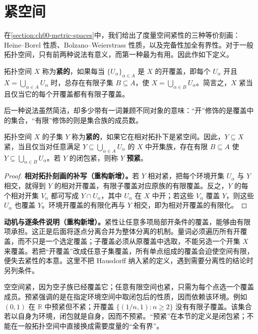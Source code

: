 \documentclass[../../main.tex]{subfiles}%
\begin{document}
\section{紧空间}\label{section:ch04-compact-spaces}
在\cref{section:ch00-metric-spaces}中，我们给出了度量空间紧性的三种等价刻画：Heine--Borel 性质、Bolzano--Weierstrass 性质，以及完备性加全有界性。对于一般拓扑空间，只有前两种说法有意义，而第一种最为有用。因此作如下定义。
\begin{definition}[紧空间]\label{definition:ch04-compact}
拓扑空间 $X$ 称为\textbf{紧的}，如果每当 $\{U_\alpha\}_{\alpha\in A}$ 是 $X$ 的开覆盖，即每个 $U_\alpha$ 开且 $X=\bigcup_{\alpha\in A}U_\alpha$ 时，总存在有限子集 $B\subseteq A$，使 $X=\bigcup_{\alpha\in B}U_\alpha$。简言之，$X$ 紧当且仅当它的每个开覆盖都有有限子覆盖。
\end{definition}
后一种说法虽然简洁，却多少带有一词兼顾不同对象的意味：“开”修饰的是覆盖中的集合，“有限”修饰的则是集合族的成员数。
\begin{definition}[紧子集与预紧子集]\label{definition:ch04-compact-subset}
拓扑空间 $X$ 的子集 $Y$ 称为\textbf{紧的}，如果它在相对拓扑下是紧空间。因此，$Y\subseteq X$ 紧，当且仅当对任意满足 $Y\subseteq\bigcup_{\alpha\in A}U_\alpha$ 的 $X$ 中开集族，存在有限 $B\subseteq A$ 使 $Y\subseteq\bigcup_{\alpha\in B}U_\alpha$。若 $Y$ 的闭包紧，则称 $Y$ \textbf{预紧}。
\end{definition}
\begin{proof}
\textbf{相对拓扑刻画的补写（重构新增）。}若 $Y$ 相对紧，把每个环境开集 $U_\alpha$ 与 $Y$ 相交，就得到 $Y$ 的相对开覆盖，有限子覆盖对应原族的有限覆盖。反之，$Y$ 的每个相对开集 $V_\alpha$ 都可写成 $Y\cap U_\alpha$，其中 $U_\alpha$ 在 $X$ 中开；若这些 $V_\alpha$ 覆盖 $Y$，则这些 $U_\alpha$ 也覆盖 $Y$。环境开覆盖的有限化再与 $Y$ 相交，即为相对开覆盖的有限化。
\end{proof}
\begin{remark}
\textbf{动机与逐条件说明（重构新增）。}紧性让任意多项局部开条件的覆盖，能够由有限项承担。这正是后面将逐点分离合并为整体分离的机制。量词必须遍历所有开覆盖，而不只是一个选定覆盖；子覆盖必须从原覆盖中选取，不能另造一个开集 $X$ 来覆盖。若把“开覆盖”改成任意子集覆盖，所有单点组成的覆盖会迫使空间有限，便失去紧性的本意。这里不把 Hausdorff 纳入紧的定义，遇到需要分离性的结论时另列条件。

空空间紧，因为空子族已经覆盖它；任意有限空间也紧，只需为每个点选一个覆盖成员。预紧强调的是在指定环境空间中取闭包后的性质，因而依赖该环境。例如 $(0,1)$ 在 $\mathbb R$ 中预紧但不紧；开覆盖 $\{(1/n,1):n\ge2\}$ 没有有限子覆盖。该集合若以自身为环境，闭包就是自身，因而不预紧。“预紧”在本节的定义是闭包紧；不能在一般拓扑空间中直接换成需要度量的“全有界”。
\end{remark}
\end{document}

